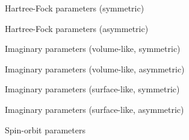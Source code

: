 \label{DOMParameters}

\begin{figure}[htp]
    \centering
    \footnotesize
    \caption{Hartree-Fock parameters (symmetric)}
    \makebox[\textwidth][c]{}
\end{figure}

\begin{figure}[htp]
    \centering
    \footnotesize
    \caption{Hartree-Fock parameters (asymmetric)}
    \makebox[\textwidth][c]{}
\end{figure}

\begin{figure}[htp]
    \centering
    \footnotesize
    \caption{Imaginary parameters (volume-like, symmetric)}
    \makebox[\textwidth][c]{}
\end{figure}

\begin{figure}[htp]
    \centering
    \footnotesize
    \caption{Imaginary parameters (volume-like, asymmetric)}
    \makebox[\textwidth][c]{}
\end{figure}

\begin{figure}[htp]
    \centering
    \footnotesize
    \caption{Imaginary parameters (surface-like, symmetric)}
    \makebox[\textwidth][c]{}
\end{figure}

\begin{figure}[htp]
    \centering
    \footnotesize
    \caption{Imaginary parameters (surface-like, asymmetric)}
    \makebox[\textwidth][c]{}
\end{figure}

\begin{figure}[htp]
    \centering
    \footnotesize
    \caption{Spin-orbit parameters}
    \makebox[\textwidth][c]{}
\end{figure}
